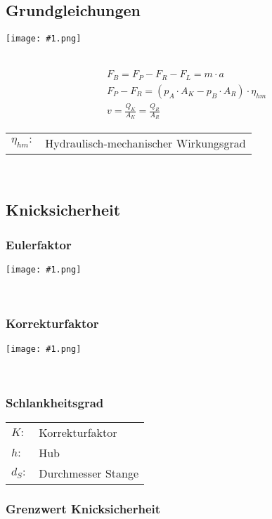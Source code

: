 \documentclass[landscape,a4paper,10pt]{article}
\newcommand{\graphiccol}[1]{
\noindent
\begin{minipage}{\columnwidth}
\centering
\texttt{[image: \#1.png]}
\end{minipage}
\medskip \\
}
\begin{document}
\begin{multicols*}{3}
\subsection{Grundgleichungen}
\graphiccol{zylinderkraefte}
\begin{align*}
&F_B = F_P - F_R - F_L = m \cdot a \\
&F_P - F_R = (p_A \cdot A_K - p_B \cdot A_R) \cdot \eta_{hm} \\
&v = \frac{Q_K}{A_K} = \frac{Q_R}{A_R} \tag{stationäre Geschw.}
\end{align*}
\begin{tabular}{ll}
$\eta_{hm}:$ & Hydraulisch-mechanischer Wirkungsgrad
\end{tabular} \\

\vfill
\columnbreak

\subsection{Knicksicherheit}
\subsubsection*{Eulerfaktor}
\graphiccol{eulerfall}

\subsubsection*{Korrekturfaktor}
\graphiccol{korrekturfaktor}

\subsubsection*{Schlankheitsgrad}
\begin{tabular}{ll}
$K:$ & Korrekturfaktor \\
$h:$ & Hub \\
$d_S:$ & Durchmesser Stange
\end{tabular}


\subsubsection*{Grenzwert Knicksicherheit}


\end{multicols*}
\end{document}
